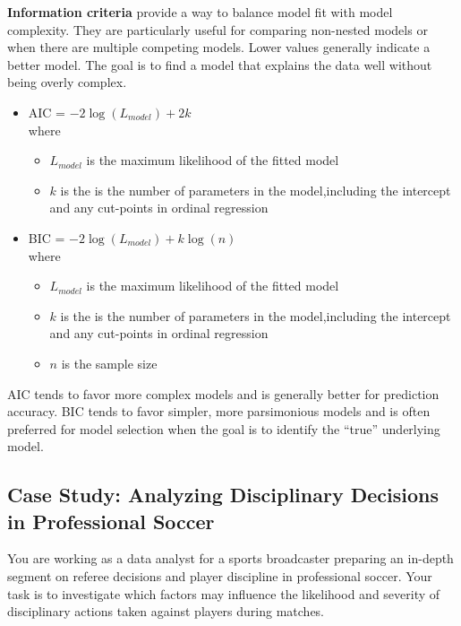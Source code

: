\documentclass[
  letterpaper,
  DIV=11,
  numbers=noendperiod]{scrartcl}
\providecommand{\tightlist}{%
  \setlength{\itemsep}{0pt}\setlength{\parskip}{0pt}}\usepackage{longtable,booktabs,array}
\begin{document}
\textbf{Information criteria} provide a way to balance model fit with
model complexity. They are particularly useful for comparing non-nested
models or when there are multiple competing models. Lower values
generally indicate a better model. The goal is to find a model that
explains the data well without being overly complex.

\begin{itemize}
\tightlist
\item
  AIC = \(-2 \log(L_{model})+2k\)\\
  where

  \begin{itemize}
  \tightlist
  \item
    \(L_{model}\) is the maximum likelihood of the fitted model
  \item
    \(k\) is the is the number of parameters in the model,including the
    intercept and any cut-points in ordinal regression
  \end{itemize}
\item
  BIC = \(-2 \log(L_{model})+k\log(n)\)\\
  where

  \begin{itemize}
  \tightlist
  \item
    \(L_{model}\) is the maximum likelihood of the fitted model
  \item
    \(k\) is the is the number of parameters in the model,including the
    intercept and any cut-points in ordinal regression
  \item
    \(n\) is the sample size
  \end{itemize}
\end{itemize}

AIC tends to favor more complex models and is generally better for
prediction accuracy. BIC tends to favor simpler, more parsimonious
models and is often preferred for model selection when the goal is to
identify the ``true'' underlying model.

\hypertarget{case-study-analyzing-disciplinary-decisions-in-professional-soccer}{%
\subsection{Case Study: Analyzing Disciplinary Decisions in Professional
Soccer}\label{case-study-analyzing-disciplinary-decisions-in-professional-soccer}}

You are working as a data analyst for a sports broadcaster preparing an
in-depth segment on referee decisions and player discipline in
professional soccer. Your task is to investigate which factors may
influence the likelihood and severity of disciplinary actions taken
against players during matches.
\end{document}
